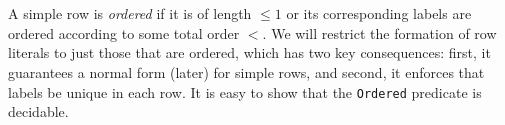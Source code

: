 \documentclass[authoryear, acmsmall, screen, review, nonacm]{acmart} %
\begin{document}
\begin{code}%
\>[0]\AgdaSpace{}%
\AgdaSymbol{:}\AgdaSpace{}%
\AgdaSymbol{(}\AgdaSpace{}%
\AgdaSymbol{:}\AgdaSpace{}%
\AgdaSpace{}%
\AgdaSpace{}%
\AgdaSpace{}%
\AgdaSpace{}%
\AgdaSymbol{)}\AgdaSpace{}%
\AgdaSpace{}%
\AgdaSpace{}%
\AgdaSpace{}%
\AgdaSpace{}%
\AgdaSpace{}%
\<%
\\
\>[0]\AgdaSpace{}%
\AgdaSpace{}%
\AgdaSpace{}%
\AgdaOperator{\AgdaInductiveConstructor{R[}}\AgdaSpace{}%
\AgdaSpace{}%
\AgdaOperator{\AgdaInductiveConstructor{]}}%
\>[24]\AgdaSymbol{=}\AgdaSpace{}%
\AgdaSpace{}%
\AgdaSymbol{(}\AgdaSpace{}%
\AgdaSpace{}%
\AgdaSpace{}%
\AgdaSpace{}%
\AgdaSymbol{)}\<%
\\
\>[0]\AgdaSpace{}%
\AgdaCatchallClause{\AgdaSymbol{\AgdaUnderscore{}}}\AgdaSpace{}%
\AgdaCatchallClause{\AgdaSymbol{\AgdaUnderscore{}}}\AgdaSpace{}%
\AgdaCatchallClause{\AgdaSymbol{\AgdaUnderscore{}}}\AgdaSpace{}%
\AgdaSymbol{=}\AgdaSpace{}%
\<%
\end{code} 

A simple row is \emph{ordered} if it is of length $\leq 1$ or its corresponding labels are ordered according to some total order $<$. We will restrict the formation of row literals to just those that are ordered, which has two key consequences: first, it guarantees a normal form (later) for simple rows, and second, it enforces that labels be unique in each row. It is easy to show that the \verb!Ordered! predicate is decidable.
\end{document}
